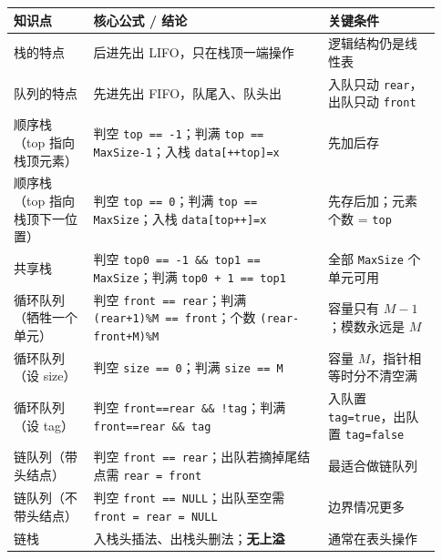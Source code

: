\documentclass[11pt,openany,UTF8]{ctexbook}
\begin{document}
\begingroup\small\setlength{\tabcolsep}{4.0pt}
\begin{longtable}{@{}L{0.1724\linewidth}L{0.5086\linewidth}L{0.2475\linewidth}@{}}
\toprule
\textbf{知识点} & \textbf{核心公式 / 结论} & \textbf{关键条件} \\
\midrule
\endhead
栈的特点 & 后进先出 LIFO，只在栈顶一端操作 & 逻辑结构仍是线性表 \\
队列的特点 & 先进先出 FIFO，队尾入、队头出 & 入队只动 \texttt{rear}，出队只动 \texttt{front} \\
顺序栈（top 指向栈顶元素） & 判空 \texttt{top =\allowbreak{}=\allowbreak{} -1}；判满 \texttt{top =\allowbreak{}=\allowbreak{} MaxSize-1}；入栈 \texttt{data[+\allowbreak{}+\allowbreak{}top]\allowbreak{}=\allowbreak{}x} & 先加后存 \\
顺序栈（top 指向栈顶下一位置） & 判空 \texttt{top =\allowbreak{}=\allowbreak{} 0}；判满 \texttt{top =\allowbreak{}=\allowbreak{} MaxSize}；入栈 \texttt{data[top+\allowbreak{}+\allowbreak{}]\allowbreak{}=\allowbreak{}x} & 先存后加；元素个数 = \texttt{top} \\
共享栈 & 判空 \texttt{top0 =\allowbreak{}=\allowbreak{} -1 \&\& top1 =\allowbreak{}=\allowbreak{} MaxSize}；判满 \texttt{top0 +\allowbreak{} 1 =\allowbreak{}=\allowbreak{} top1} & 全部 \texttt{MaxSize} 个单元可用 \\
循环队列（牺牲一个单元） & 判空 \texttt{front =\allowbreak{}=\allowbreak{} rear}；判满 \texttt{(rear+\allowbreak{}1)\allowbreak{}\%M =\allowbreak{}=\allowbreak{} front}；个数 \texttt{(rear-front+\allowbreak{}M)\allowbreak{}\%M} & 容量只有 $M-1$；模数永远是 $M$ \\
循环队列（设 size） & 判空 \texttt{size =\allowbreak{}=\allowbreak{} 0}；判满 \texttt{size =\allowbreak{}=\allowbreak{} M} & 容量 $M$，指针相等时分不清空满 \\
循环队列（设 tag） & 判空 \texttt{front=\allowbreak{}=\allowbreak{}rear \&\& !tag}；判满 \texttt{front=\allowbreak{}=\allowbreak{}rear \&\& tag} & 入队置 \texttt{tag=\allowbreak{}true}，出队置 \texttt{tag=\allowbreak{}false} \\
链队列（带头结点） & 判空 \texttt{front =\allowbreak{}=\allowbreak{} rear}；出队若摘掉尾结点需 \texttt{rear =\allowbreak{} front} & 最适合做链队列 \\
链队列（不带头结点） & 判空 \texttt{front =\allowbreak{}=\allowbreak{} NULL}；出队至空需 \texttt{front =\allowbreak{} rear =\allowbreak{} NULL} & 边界情况更多 \\
链栈 & 入栈头插法、出栈头删法；\textbf{无上溢} & 通常在表头操作 \\

\end{longtable}
\end{document}
